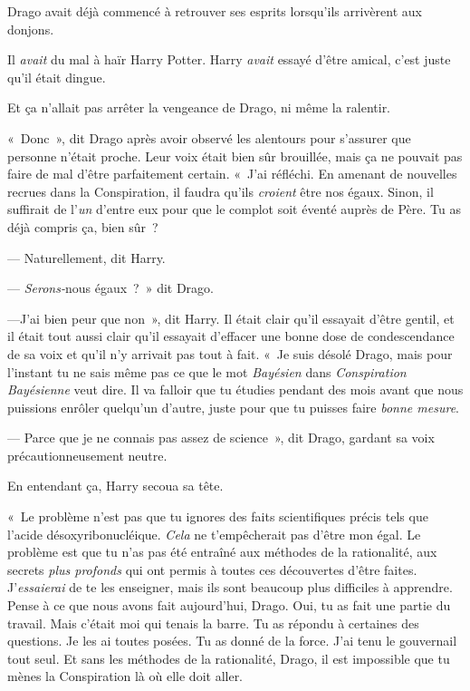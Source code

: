 \later

Drago avait déjà commencé à retrouver ses esprits lorsqu'ils arrivèrent aux donjons.

Il \emph{avait} du mal à haïr Harry Potter. Harry \emph{avait} essayé d'être amical, c'est juste qu'il était dingue.

Et ça n'allait pas arrêter la vengeance de Drago, ni même la ralentir.

«~Donc~», dit Drago après avoir observé les alentours pour s'assurer que personne n'était proche. Leur voix était bien sûr brouillée, mais ça ne pouvait pas faire de mal d'être parfaitement certain. «~J'ai réfléchi. En amenant de nouvelles recrues dans la Conspiration, il faudra qu'ils \emph{croient} être nos égaux. Sinon, il suffirait de l'\emph{un} d'entre eux pour que le complot soit éventé auprès de Père. Tu as déjà compris ça, bien sûr~?

--- Naturellement, dit Harry.

--- \emph{Serons-}nous égaux~?~» dit Drago.

---J'ai bien peur que non~», dit Harry. Il était clair qu'il essayait d'être gentil, et il était tout aussi clair qu'il essayait d'effacer une bonne dose de condescendance de sa voix et qu'il n'y arrivait pas tout à fait. «~Je suis désolé Drago, mais pour l'instant tu ne sais même pas ce que le mot \emph{Bayésien} dans \emph{Conspiration} \emph{Bayésienne} veut dire. Il va falloir que tu étudies pendant des mois avant que nous puissions enrôler quelqu'un d'autre, juste pour que tu puisses faire \emph{bonne mesure}.

--- Parce que je ne connais pas assez de science~», dit Drago, gardant sa voix précautionneusement neutre.

En entendant ça, Harry secoua sa tête.

«~Le problème n'est pas que tu ignores des faits scientifiques précis tels que l'acide désoxyribonucléique. \emph{Cela} ne t'empêcherait pas d'être mon égal. Le problème est que tu n'as pas été entraîné aux méthodes de la rationalité, aux secrets \emph{plus profonds} qui ont permis à toutes ces découvertes d'être faites. J'\emph{essaierai} de te les enseigner, mais ils sont beaucoup plus difficiles à apprendre. Pense à ce que nous avons fait aujourd'hui, Drago. Oui, tu as fait une partie du travail. Mais c'était moi qui tenais la barre. Tu as répondu à certaines des questions. Je les ai toutes posées. Tu as donné de la force. J'ai tenu le gouvernail tout seul. Et sans les méthodes de la rationalité, Drago, il est impossible que tu mènes la Conspiration là où elle doit aller.

